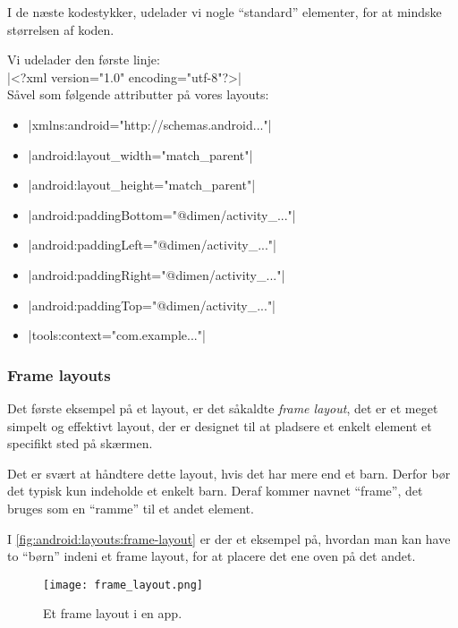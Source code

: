 \begin{remark}
	I de næste kodestykker, udelader vi nogle ``standard'' elementer, for at mindske størrelsen af koden.
	
	Vi udelader den første linje: \\
	\XmlInline|<?xml version="1.0" encoding="utf-8"?>|\\
	Såvel som følgende attributter på vores layouts:
	\begin{itemize}
		\item \XmlInline|xmlns:android="http://schemas.android..."|
		\item \XmlInline|android:layout_width="match_parent"|
		\item \XmlInline|android:layout_height="match_parent"|
		\item \XmlInline|android:paddingBottom="@dimen/activity_..."|
		\item \XmlInline|android:paddingLeft="@dimen/activity_..."|
		\item \XmlInline|android:paddingRight="@dimen/activity_..."|
		\item \XmlInline|android:paddingTop="@dimen/activity_..."|
		\item \XmlInline|tools:context="com.example..."|
	\end{itemize}
\end{remark}

\cleartoleftpage
\FloatBarrier

\subsubsection{Frame layouts}

Det første eksempel på et layout, er det såkaldte \textit{frame layout}, det er et meget simpelt og effektivt layout, der er designet til at pladsere et enkelt element et specifikt sted på skærmen.

Det er svært at håndtere dette layout, hvis det har mere end et barn. Derfor bør 
det typisk kun indeholde et enkelt barn. Deraf kommer navnet ``frame'', det 
bruges som en ``ramme'' til et andet element.

I \autoref{fig:android:layouts:frame-layout} er der et eksempel på, hvordan man 
kan have to ``børn'' indeni et frame layout, for at placere det ene oven på det 
andet.

\begin{figure}[!b]
	\begin{center}
		\texttt{[image: frame\_layout.png]}
		\caption{Et frame layout i en app.}
		\label{fig:android:layouts:frame-layout}
	\end{center}
\end{figure}


